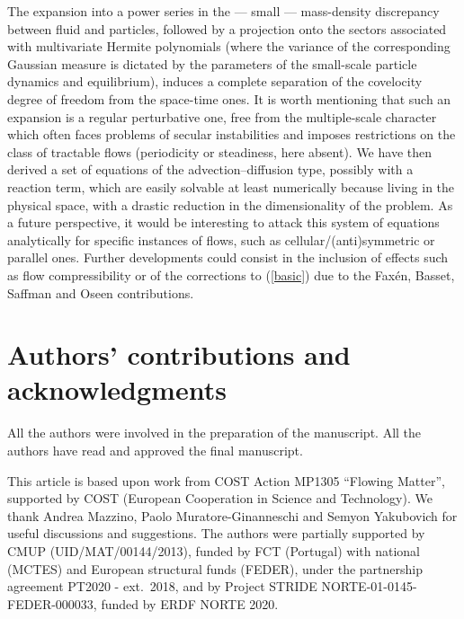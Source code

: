 The expansion into a power series in the --- small --- mass-density discrepancy between fluid and particles,
followed by a projection onto the sectors associated with multivariate Hermite polynomials
(where the variance of the corresponding Gaussian measure is dictated by the parameters of the small-scale particle dynamics and equilibrium),
induces a complete separation of the covelocity degree of freedom from the space-time ones.
It is worth mentioning that such an expansion is a regular perturbative one,
free from the multiple-scale character which often faces problems of secular instabilities
and imposes restrictions on the class of tractable flows (periodicity or steadiness, here absent).
We have then derived a set of equations of the advection--diffusion type, possibly with a reaction term,
which are easily solvable at least numerically because living in the physical space,
with a drastic reduction in the dimensionality of the problem.
As a future perspective, it would be interesting to attack this system of equations analytically
for specific instances of flows, such as cellular/(anti)symmetric \cite{MAG17} or parallel \cite{MAMGM17} ones.
Further developments could consist in the inclusion of effects such as flow compressibility
or of the corrections to (\ref{basic}) due to the Fax\'en, Basset, Saffman and Oseen contributions.
%
\section*{Authors' contributions and acknowledgments}
All the authors were involved in the preparation of the manuscript.
All the authors have read and approved the final manuscript.

\begin{acknowledgement}
This article is based upon work from COST Action MP1305 ``Flowing Matter'', supported by COST (European Cooperation in Science and Technology).
We thank Andrea Mazzino, Paolo Muratore-Ginanneschi and Semyon Yakubovich for useful discussions and suggestions.
The authors were partially supported by CMUP (UID/MAT/00144/2013), funded by FCT (Portugal) with national (MCTES)
and European structural funds (FEDER), under the partnership agreement PT2020 - ext.\ 2018,
and by Project STRIDE NORTE-01-0145-FEDER-000033, funded by ERDF NORTE 2020.
\end{acknowledgement}

